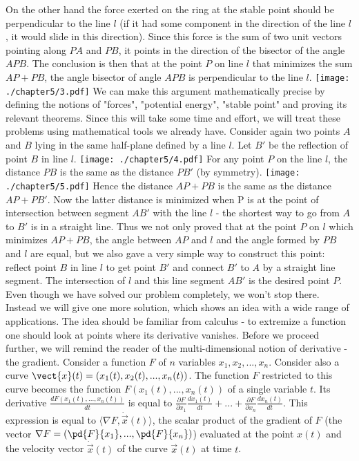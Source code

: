 On the other hand the force exerted on the ring at the stable point should be perpendicular to the line $l$ (if it had some component in the direction of the line $l$, it would slide in this direction). Since this force is the sum of two unit vectors pointing along $PA$ and $PB$, it points in the direction of the bisector of the angle $APB$.
The conclusion is then that at the point $P$ on line $l$ that minimizes the sum $AP+PB$, the angle bisector of angle $APB$ is perpendicular to the line $l$.
\texttt{[image: ./chapter5/3.pdf]}
We can make this argument mathematically precise by defining the notions of "forces", "potential energy", "stable point" and proving its relevant theorems. Since this will take some time and effort, we will treat these problems using mathematical tools we already have.
Consider again two points $A$ and $B$ lying in the same half-plane defined by a line $l$. Let $B'$ be the reflection of point $B$ in line $l$.
\texttt{[image: ./chapter5/4.pdf]}
For any point $P$ on the line $l$, the distance $PB$ is the same as the distance $PB'$ (by symmetry).
\texttt{[image: ./chapter5/5.pdf]}
Hence the distance $AP+PB$ is the same as the distance $AP+PB'$. Now the latter distance is minimized when P is at the point of intersection between segment $AB'$ with the line $l$ - the shortest way to go from $A$ to $B'$ is in a straight line.
Thus we not only proved that at the point $P$ on $l$ which minimizes $AP+PB$, the angle between $AP$ and $l$ and the angle formed by $PB$ and $l$ are equal, but we also gave a very simple way to construct this point: reflect point $B$ in line $l$ to get point $B'$ and connect $B'$ to $A$ by a straight line segment. The intersection of $l$ and this line segment $AB'$ is the desired point $P$.
Even though we have solved our problem completely, we won't stop there. Instead we will give one more solution, which shows an idea with a wide range of applications. The idea should be familiar from calculus - to extremize a function one should look at points where its derivative vanishes.
Before we proceed further, we will remind the reader of the multi-dimensional notion of derivative - the gradient.
Consider a function $F$ of $n$ variables $x_1,x_2,...,x_n$. Consider also a curve $\vect{x}(t)=(x_1(t),x_2(t),...,x_n(t))$. The function $F$ restricted to this curve becomes the function $F(x_1(t),...,x_n(t))$ of a single variable $t$. Its derivative $\frac{dF(x_1(t),...,x_n(t))}{dt}$ is equal to $\frac{\partial F}{\partial x_1}\frac{dx_1(t)}{dt}+...+\frac{\partial F}{\partial x_n}\frac{dx_n(t)}{dt}$. This expression is equal to $\langle \nabla F, \dot{\vec x}(t)\rangle$, the scalar product of the gradient of $F$ (the vector $\nabla F=(\pd{F}{x_1},...,\pd{F}{x_n})$) evaluated at the point $x(t)$ and the velocity vector $\dot{\vec x}(t)$ of the curve $\vec x(t)$ at time $t$.
